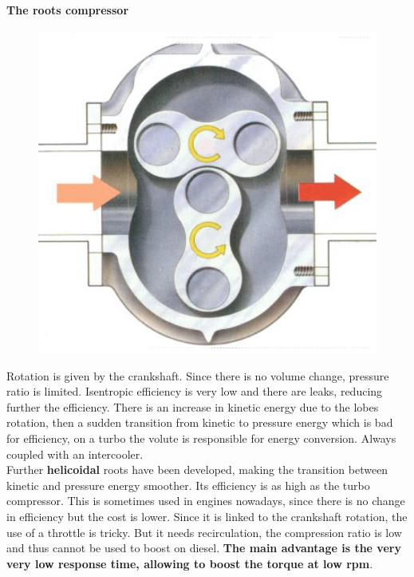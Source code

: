 \paragraph{The roots compressor}
	\begin{figure}
	\vspace{-20mm}
	\includegraphics[scale=0.3]{ch7/17}
	\end{figure}
	Rotation is given by the crankshaft. Since there is no volume change, pressure ratio is limited. Isentropic efficiency is very low and there are leaks, reducing further the efficiency. There is an increase in kinetic energy due to the lobes rotation, then a sudden transition from kinetic to pressure energy which is bad for efficiency, on a turbo the volute is responsible for energy conversion. Always coupled with an intercooler. \\
	
	Further \textbf{helicoidal} roots have been developed, making the transition between kinetic and pressure energy smoother. Its efficiency is as high as the turbo compressor. This is sometimes used in engines nowadays, since there is no change in efficiency but the cost is lower. Since it is linked to the crankshaft rotation, the use of a throttle is tricky. But it needs recirculation, the compression ratio is low and thus cannot be used to boost on diesel. \textbf{The main advantage is the very very low response time, allowing to boost the torque at low rpm}. \\
	
